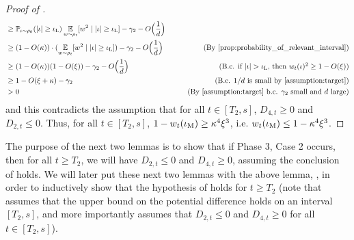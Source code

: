 \begin{proof}[Proof of ]
\begin{align}
& \geq \Prob_{\iota \sim \rho_0} (|\iota| \geq \iotaL) \E_{\w \sim \rho_t}[\w^2 \mid |\iota| \geq \iotaL] - \gamma_2 - O\Big(\frac{1}{d}\Big) \\
& \geq (1 - O(\kappa)) \cdot (\E_{\w \sim \rho_t}[\w^2 \mid |\iota| \geq \iotaL]) - \gamma_2 - O\Big(\frac{1}{d}\Big)
& \tag{By \Cref{prop:probability_of_relevant_interval}} \\
& \geq (1 - O(\kappa)) (1 - O(\xi)) - \gamma_2 - O\Big(\frac{1}{d}\Big)
& \tag{B.c. if $|\iota| > \iotaL$, then $\w_t(\iota)^2 \geq 1 - O(\xi)$} \\
& \geq 1 - O(\xi + \kappa) - \gamma_2 
& \tag{B.c. $1/d$ is small by \Cref{assumption:target}} \\
& > 0
& \tag{By \Cref{assumption:target} b.c. $\gamma_2$ small and $d$ large}
\end{align}
and this contradicts the assumption that for all $t \in [T_2, s]$, $D_{4, t} \geq 0$ and $D_{2, t} \leq 0$. Thus, for all $t \in [T_2, s]$, $1 - w_t(\iota_{\textup{M}}) \geq \kappa^4 \xi^3$, i.e. $w_t(\iota_{\textup{M}}) \leq 1 - \kappa^4 \xi^3$.
\end{proof}

The purpose of the next two lemmas is to show that if Phase 3, Case 2 occurs, then for all $t \geq T_2$, we will have $D_{2, t} \leq 0$ and $D_{4, t} \geq 0$, assuming the conclusion of  holds. We will later put these next two lemmas with the above lemma, , in order to inductively show that the hypothesis of  holds for $t \geq T_2$ (note that  assumes that the upper bound on the potential difference holds on an interval $[T_2, s]$, and more importantly assumes that $D_{2, t} \leq 0$ and $D_{4, t} \geq 0$ for all $t \in [T_2, s]$).

